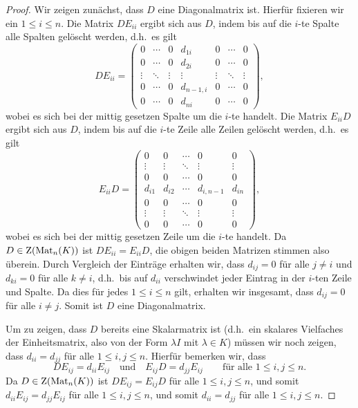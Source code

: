\documentclass[a4paper, 10pt, numbers=noenddot]{scrartcl}
\begin{document}
\begin{proof}
  Wir zeigen zunächst, dass $D$ eine Diagonalmatrix ist.
  Hierfür fixieren wir ein $1 \leq i \leq n$.
  Die Matrix $D E_{ii}$ ergibt sich aus $D$, indem bis auf die $i$-te Spalte alle Spalten gelöscht werden, d.h.\ es gilt
  \[
      D E_{ii}
    = \begin{pmatrix}
        0       & \cdots  & 0       & d_{1i}    & 0       & \cdots  & 0       \\
        0       & \cdots  & 0       & d_{2i}    & 0       & \cdots  & 0       \\
        \vdots  & \ddots  & \vdots  & \vdots    & \vdots  & \ddots  & \vdots  \\
        0       & \cdots  & 0       & d_{n-1,i} & 0       & \cdots  & 0       \\
        0       & \cdots  & 0       & d_{ni}    & 0       & \cdots  & 0
      \end{pmatrix},
  \]
  wobei es sich bei der mittig gesetzen Spalte um die $i$-te handelt.
  Die Matrix $E_{ii} D$ ergibt sich aus $D$, indem bis auf die $i$-te Zeile alle Zeilen gelöscht werden, d.h.\ es gilt
  \[
      E_{ii} D
    = \begin{pmatrix}
        0       & 0       & \cdots  & 0         & 0       \\
        \vdots  & \vdots  & \ddots  & \vdots    & \vdots  \\
        0       & 0       & \cdots  & 0         & 0       \\
        d_{i1}  & d_{i2}  & \cdots  & d_{i,n-1} & d_{in}  \\
        0       & 0       & \cdots  & 0         & 0       \\
        \vdots  & \vdots  & \ddots  & \vdots    & \vdots  \\
        0       & 0       & \cdots  & 0         & 0
      \end{pmatrix},
  \]
  wobei es sich bei der mittig gesetzen Zeile um die $i$-te handelt.
  Da $D \in \operatorname{Z}(\operatorname{Mat}_n(K))$ ist $D E_{ii} = E_{ii} D$, die obigen beiden Matrizen stimmen also überein.
  Durch Vergleich der Einträge erhalten wir, dass $d_{ij} = 0$ für alle $j \neq i$ und $d_{ki} = 0$ für alle $k \neq i$, d.h.\ bis auf $d_{ii}$ verschwindet jeder Eintrag in der $i$-ten Zeile und Spalte.
  Da dies für jedes $1 \leq i \leq n$ gilt, erhalten wir insgesamt, dass $d_{ij} = 0$ für alle $i \neq j$.
  Somit ist $D$ eine Diagonalmatrix.
  
  Um zu zeigen, dass $D$ bereits eine Skalarmatrix ist (d.h.\ ein skalares Vielfaches der Einheitsmatrix, also von der Form $\lambda I$ mit $\lambda \in K$) müssen wir noch zeigen, dass $d_{ii} = d_{jj}$ für alle $1 \leq i,j \leq n$.
  Hierfür bemerken wir, dass
  \[
    D E_{ij} = d_{ii} E_{ij}
    \quad\text{und}\quad
    E_{ij} D = d_{jj} E_{ij}
    \qquad
    \text{für alle $1 \leq i,j \leq n$}.
  \]
  Da $D \in \operatorname{Z}(\operatorname{Mat}_n(K))$ ist $D E_{ij} = E_{ij} D$ für alle $1 \leq i,j \leq n$, und somit $d_{ii} E_{ij} = d_{jj} E_{ij}$ für alle $1 \leq i,j \leq n$, und somit $d_{ii} = d_{jj}$ für alle $1 \leq i,j \leq n$.
\end{proof}
\end{document}
